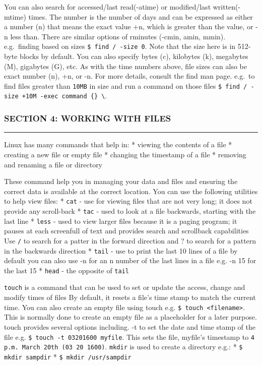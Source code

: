 You can also search for accessed/last read(-atime) or modified/last
written(-mtime) times. The number is the number of days and can be
expressed as either a number (n) that means the exact value +n, which is
greater than the value, or -n less than. There are similar options of
rminutes (-cmin, amin, mmin). e.g.~finding based on sizes
\texttt{\$ find / -size 0}. Note that the size here is in 512-byte
blocks by default. You can also specify bytes (c), kilobytes (k),
megabytes (M), gigabytes (G), etc. As with the time numbers above, file
sizes can also be exact number (n), +n, or -n. For more details, consult
the find man page. e.g.~to find files greater than \texttt{10MB} in size
and run a command on those files
\texttt{\$ find / -size +10M -exec command \{\} \textbackslash{}}.

\subsubsection{SECTION 4: WORKING WITH
FILES}\label{section-4-working-with-files}

\begin{center}\rule{3in}{0.4pt}\end{center}

Linux has many commands that help in: * viewing the contents of a file *
creating a new file or empty file * changing the timestamp of a file *
removing and renaming a file or directory

These command help you in managing your data and files and ensuring the
correct data is available at the correct location. You can use the
following utilities to help view files: * \texttt{cat} - use for viewing
files that are not very long; it does not provide any scroll-back *
\texttt{tac} - used to look at a file backwards, starting with the last
line * \texttt{less} - used to view larger files because it is a paging
program; it pauses at each screenfull of text and provides search and
scrollback capabilities Use \texttt{/} to search for a patter in the
forward direction and ? to search for a pattern in the backwards
direction * \texttt{tail} - use to print the last 10 lines of a file by
default you can also use -n for an n number of the last lines in a file
e.g. -n 15 for the last 15 * \texttt{head} - the opposite of
\texttt{tail}

\texttt{touch} is a command that can be used to set or update the
access, change and modify times of files By default, it resets a file's
time stamp to match the current time. You can also create an empty file
using touch e.g. \texttt{\$ touch \textless{}filename\textgreater{}}.
This is normally done to create an empty file as a placeholder for a
later purpose. touch provides several options including. -t to set the
date and time stamp of the file e.g.
\texttt{\$ touch -t 03201600 myfile}. This sets the file, myfile's
timestamp to \texttt{4 p.m. March 20th (03 20 1600)}. \texttt{mkdir} is
used to create a directory e.g.: * \texttt{\$ mkdir sampdir} *
\texttt{\$ mkdir /usr/sampdir}

